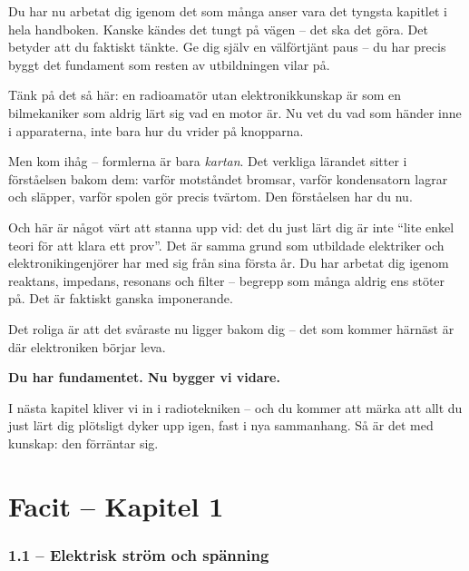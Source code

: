 \documentclass[a4paper,11pt,twoside]{book}
\begin{document}
Du har nu arbetat dig igenom det som många anser vara det tyngsta kapitlet i hela handboken. Kanske kändes det tungt på vägen – det ska det göra. Det betyder att du faktiskt tänkte. Ge dig själv en välförtjänt paus – du har precis byggt det fundament som resten av utbildningen vilar på.

Tänk på det så här: en radioamatör utan elektronikkunskap är som en bilmekaniker som aldrig lärt sig vad en motor är. Nu vet du vad som händer inne i apparaterna, inte bara hur du vrider på knopparna.

\noindent
Men kom ihåg – formlerna är bara \textit{kartan}. Det verkliga lärandet sitter i förståelsen bakom dem: varför motståndet bromsar, varför kondensatorn lagrar och släpper, varför spolen gör precis tvärtom. Den förståelsen har du nu.

\medskip
\noindent
Och här är något värt att stanna upp vid: det du just lärt dig är inte \enquote{lite enkel teori för att klara ett prov}. Det är samma grund som utbildade elektriker och elektronikingenjörer har med sig från sina första år. Du har arbetat dig igenom reaktans, impedans, resonans och filter -- begrepp som många aldrig ens stöter på. Det är faktiskt ganska imponerande.

\medskip
\noindent
Det roliga är att det svåraste nu ligger bakom dig – det som kommer härnäst är där elektroniken börjar leva.

\begin{bluebox}[title={}]
\textbf{Du har fundamentet. Nu bygger vi vidare.}

\smallskip
I nästa kapitel kliver vi in i radiotekniken – och du kommer att märka att allt du just lärt dig plötsligt dyker upp igen, fast i nya sammanhang. Så är det med kunskap: den förräntar sig.
\end{bluebox}

\chapter*{Facit – Kapitel 1}

\subsection*{1.1 – Elektrisk ström och spänning}
\end{document}
